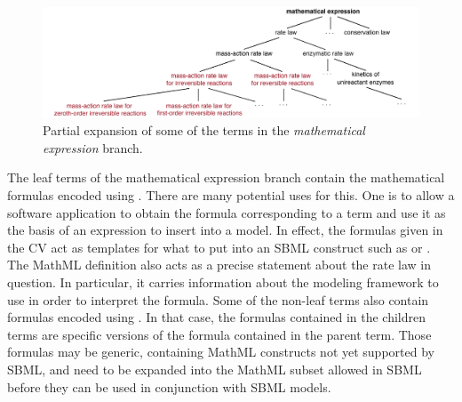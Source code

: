 \begin{figure}[tbh]
  \centering
  \vspace*{-1ex}
  \includegraphics[scale = 0.8, trim=10 0 0 0]{figs/sbo-math-expression}
  \caption{Partial expansion of some of the terms in the \emph{mathematical
      expression} branch.}
  \label{fig:sbo-math-expression}
\end{figure}

The leaf terms of the mathematical expression branch contain the
mathematical formulas encoded using \mathmltwo.  There are many
potential uses for this.  One is to allow a software application
to obtain the formula corresponding to a term and use it as the
basis of an expression to insert into a model.  In effect, the
formulas given in the CV act as templates for what to put into an
SBML construct such as \KineticLaw or \Rule.  The MathML
definition also acts as a precise statement about the rate law in
question. In particular, it carries information about the modeling
framework to use in order to interpret the formula.  Some of the
non-leaf terms also contain formulas encoded using \mathmltwo. In
that case, the formulas contained in the children terms are
specific versions of the formula contained in the parent term.
Those formulas may be generic, containing MathML constructs not
yet supported by SBML, and need to be expanded into the MathML
subset allowed in SBML before they can be used in conjunction with
SBML models.

